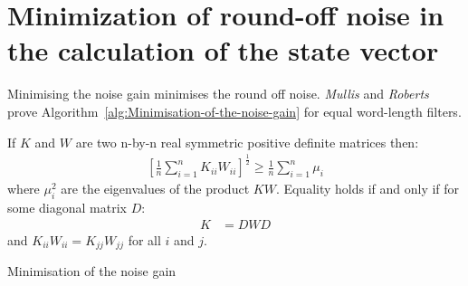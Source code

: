 \documentclass[a4paper,twoside,10pt,english]{report}
\begin{document}
\section{\label{sec:Minimisation-of-round-off-noise}Minimization of round-off noise in the calculation of the state vector}
Minimising the noise gain minimises the round off noise. \emph{Mullis} and
\emph{Roberts}~\cite{MullisRoberts_SynthesisMinimumRoundoffNoiseDigitalFilters}
prove Algorithm~\ref{alg:Minimisation-of-the-noise-gain} for equal word-length 
filters.
\begin{algorithm}[!htpb]
If $K$ and $W$ are two n-by-n real symmetric positive definite matrices
then:
\begin{align*}
\left[ \frac{1}{n} {\sum^{n}_{i=1}} K_{ii} W_{ii} \right] ^{\frac{1}{2}} \ge \frac{1}{n} {\sum^{n}_{i=1}}\mu_{i}
\end{align*}
where $\mu_{i}^{2}$ are the eigenvalues of the product $KW$. Equality
holds if and only if for some diagonal matrix $D$:
\begin{align*}
K&=DWD
\end{align*}
and $K_{ii}W_{ii}=K_{jj}W_{jj}$ for all $i$ and $j$.
\caption{Minimisation of the noise gain}
\label{alg:Minimisation-of-the-noise-gain}
\end{algorithm}
\end{document}
